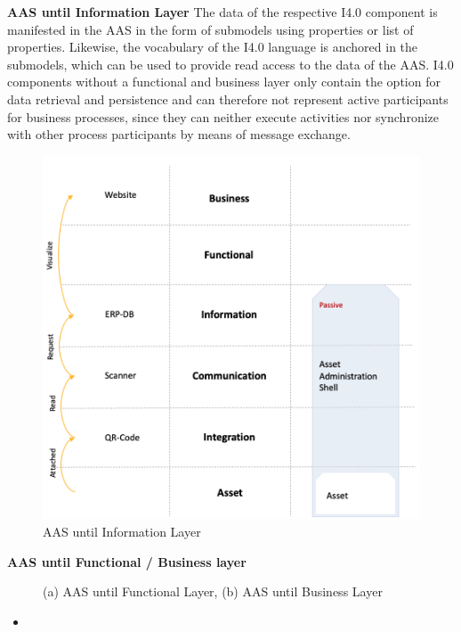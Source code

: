 \textbf{\ac{AAS} until Information Layer}
The data of the respective \ac{I4.0} component is manifested in the \ac{AAS} in the form of submodels using properties or list of properties. Likewise, the vocabulary of the \ac{I4.0} language is anchored in the submodels, which can be used to provide read access to the data of the \ac{AAS}. \ac{I4.0} components without a functional and business layer only contain the option for data retrieval and persistence and can therefore not represent active participants for business processes, since they can neither execute activities nor synchronize with other process participants by means of message exchange.
\begin{figure}[h]
\centering
\includegraphics[width=.45\textwidth]{content/pictures/aas_rami_v1.png}
\caption{\ac{AAS} until Information Layer}
\label{fig:aas-until-info-layer}
\end{figure}

\textbf{\ac{AAS} until Functional / Business layer}

\begin{figure}[h]
\centering
{}
\caption{(a) \ac{AAS} until Functional Layer, (b) \ac{AAS} until Business Layer}
\label{fig:structureaas}
\end{figure}


\begin{itemize}
    \item []
\end{itemize}





